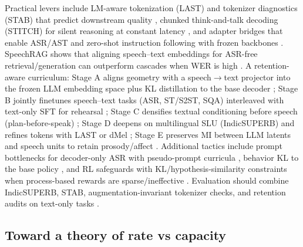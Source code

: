 \documentclass{article}
\begin{document}
Practical levers include LM-aware tokenization (LAST) and tokenizer diagnostics (STAB) that predict downstream quality \cite{turetzky2024lastlanguagemodelawarespeechtokenization,vashishth2024stabspeechtokenizerassessmentbenchmark}, chunked think-and-talk decoding (STITCH) for silent reasoning at constant latency \cite{chiang2025stitchsimultaneousthinkingtalkingchunked}, and adapter bridges that enable ASR/AST and zero-shot instruction following with frozen backbones \cite{wang2023slmbridgethingapbetweenspeechtextfoundat}. SpeechRAG shows that aligning speech--text embeddings for ASR-free retrieval/generation can outperform cascades when WER is high \cite{min2025speechretrievalaugmentedgenerationwithou}. A retention-aware curriculum: Stage A aligns geometry with a speech$\rightarrow$text projector into the frozen LLM embedding space plus KL distillation to the base decoder \cite{turetzky2024lastlanguagemodelawarespeechtokenization,wang2023slmbridgethingapbetweenspeechtextfoundat,hassid2024textuallypretrainedspeechlanguagemodels}; Stage B jointly finetunes speech--text tasks (ASR, ST/S2ST, SQA) interleaved with text-only SFT for rehearsal \cite{peng2024mslms2stmultitaskspeechlanguagemodeltext,peng2025voicetextblenderaugmentinglargelanguagem,wang2023slmbridgethingapbetweenspeechtextfoundat}; Stage C densifies textual conditioning before speech (plan-before-speak) \cite{cui2025thinkbeforeyoutalkenhancingmeaningfuldia}; Stage D deepens on multilingual SLU (IndicSUPERB) and refines tokens with LAST or dMel \cite{entry2025indicsuperbspeechprocessinguniversalperf,turetzky2024lastlanguagemodelawarespeechtokenization,bai2025dmelspeechtokenizationmadesimple}; Stage E preserves MI between LLM latents and speech units to retain prosody/affect \cite{wang2025bossbeyondsemanticspeech}. Additional tactics include prompt bottlenecks for decoder-only ASR with pseudo-prompt curricula \cite{tsunoo2024decoderonlyarchitecturespeechrecognition}, behavior KL to the base policy \cite{wang2024blspemotowardsempatheticlargespeechlangu}, and RL safeguards with KL/hypothesis-similarity constraints when process-based rewards are sparse/ineffective \cite{li2025seewossubmissionmlcslmlessonslearnedspee}. Evaluation should combine IndicSUPERB, STAB, augmentation-invariant tokenizer checks, and retention audits on text-only tasks \cite{vashishth2024stabspeechtokenizerassessmentbenchmark,entry2025augmentationinvariantdiscreterepresentat,entry2025indicsuperbspeechprocessinguniversalperf}.

\subsection{Toward a theory of rate vs capacity} \label{subsec:Toward a theory of rate vs capacity}
\end{document}
